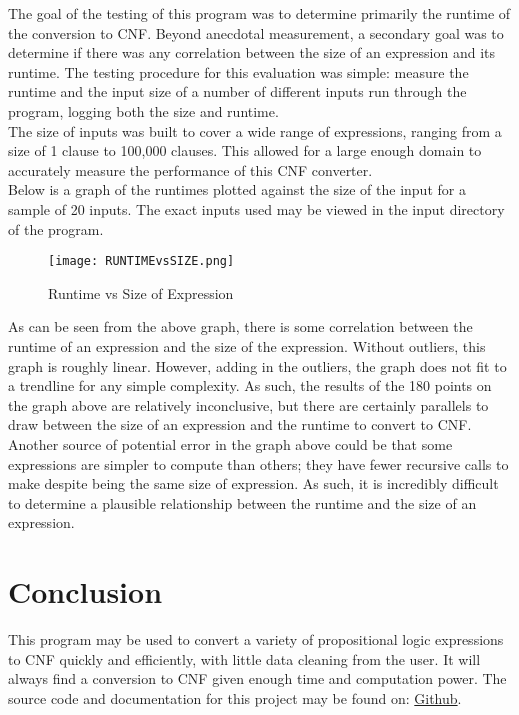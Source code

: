 \documentclass[12pt]{report}
\begin{document}
\noindent The goal of the testing of this program was to determine primarily the runtime of the conversion to CNF. Beyond anecdotal measurement, a secondary goal was to determine if  there was any correlation between the size of an expression and its runtime. The testing procedure for this evaluation was simple: measure the runtime and the input size of a number of different inputs run through the program, logging both the size and runtime.\\

\noindent The size of inputs was built to cover a wide range of expressions, ranging from a size of 1 clause to 100,000 clauses. This allowed for a large enough domain to accurately measure the performance of this CNF converter. \\

\noindent Below is a graph of the runtimes plotted against the size of the input for a sample of 20 inputs. The exact inputs used may be viewed in the input directory of the program.\\

\begin{figure}[H]
    \centering
    \texttt{[image: RUNTIMEvsSIZE.png]}
    \caption{Runtime vs Size of Expression}
    \label{fig:my_label}
\end{figure}

\noindent As can be seen from the above graph, there is some correlation between the runtime of an expression and the size of the expression. Without outliers, this graph is roughly linear. However, adding in the outliers, the graph does not fit to a trendline for any simple complexity. As such, the results of the 180  points on the graph above are relatively inconclusive, but there are certainly parallels to draw between the size of an expression and the runtime to convert to CNF. \\

\noindent Another source of potential error in the graph above could be that some expressions are simpler to compute than others; they have fewer recursive calls to make despite being the same size of expression. As such, it is incredibly difficult to determine a plausible relationship between the runtime and the size of an expression.

\section*{Conclusion}

\noindent This program may be used to convert a variety of propositional logic expressions to CNF quickly and efficiently, with little data cleaning from the user. It will always find a conversion to CNF given enough time and computation power. The source code and documentation for this project may be found on: \href{https://github.com/mihumphrey/CNFConverter}{Github}.
\end{document}

